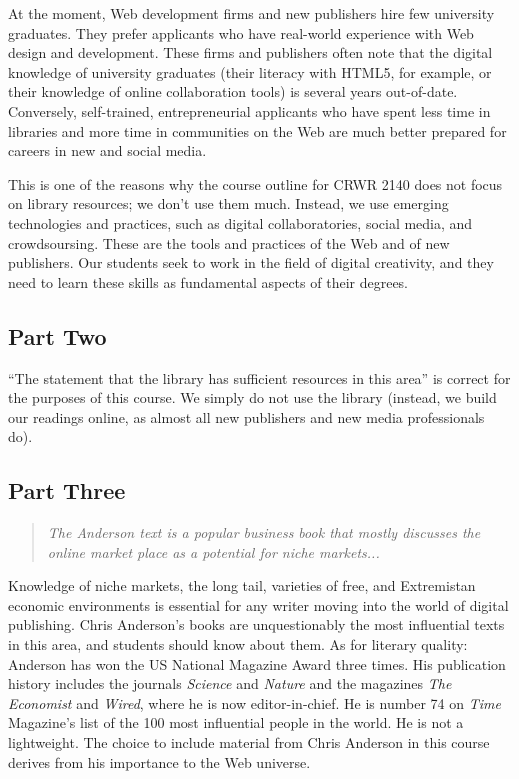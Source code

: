 \documentclass[letterpaper,10pt,headsepline]{scrreprt}
\begin{document}
At the moment, Web development firms and new publishers hire few university graduates. They prefer applicants who have real-world experience with Web design and development. These firms and publishers often note that the digital knowledge of university graduates (their literacy with HTML5, for example, or their knowledge of online collaboration tools) is several years out-of-date. Conversely, self-trained, entrepreneurial applicants who have spent less time in libraries and more time in communities on the Web are much better prepared for careers in new and social media.

This is one of the reasons why the course outline for CRWR 2140 does not focus on library resources; we don't use them much. Instead, we use emerging technologies and practices, such as digital collaboratories, social media, and crowdsoursing. These are the tools and practices of the Web and of new publishers. Our students seek to work in the field of digital creativity, and they need to learn these skills as fundamental aspects of their degrees.

\subsection{Part Two}

``The statement that the library has sufficient resources in this area'' is correct for the purposes of this course. We simply do not use the library (instead, we build our readings online, as almost all new publishers and new media professionals do).

\subsection{Part Three}

\begin{quote}
\textit{The Anderson text is a popular business book that mostly discusses the online market place as a potential for niche markets...}
\end{quote}

Knowledge of niche markets, the long tail, varieties of free, and Extremistan economic environments is essential for any writer moving into the world of digital publishing. Chris Anderson's books are unquestionably the most influential texts in this area, and students should know about them. As for literary quality: Anderson has won the US National Magazine Award three times. His publication history includes the journals \textit{Science} and \textit{Nature} and the magazines \textit{The Economist} and \textit{Wired}, where he is now editor-in-chief. He is number 74 on \textit{Time} Magazine's list of the 100 most influential people in the world. He is not a lightweight. The choice to include material from Chris Anderson in this course derives from his importance to the Web universe.
\end{document}
